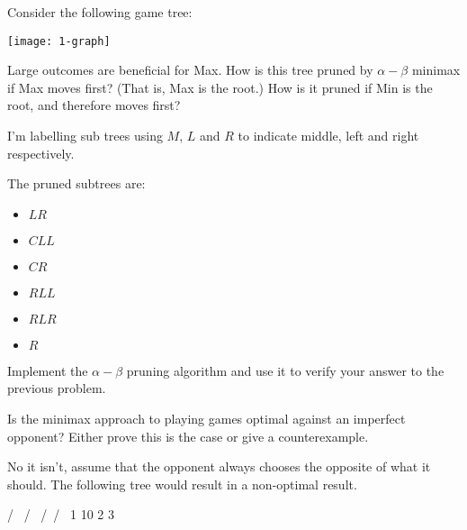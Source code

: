 \documentclass{supervision}
\begin{document}
\begin{questions}
    \question Consider the following game tree:
      \begin{center}
        \texttt{[image: 1-graph]}
      \end{center}

      Large outcomes are beneficial for Max. How is this tree pruned by $\alpha
      - \beta$ minimax if Max moves first? (That is, Max is the root.) How is it
      pruned if Min is the root, and therefore moves first?

      \begin{solution}
        I'm labelling sub trees using $M$, $L$ and $R$ to indicate middle, left
        and right respectively.

        The pruned subtrees are:

        \begin{itemize}
          \item $LR$
          \item $CLL$
          \item $CR$
          \item $RLL$
          \item $RLR$
          \item $R$
        \end{itemize}
      \end{solution}

    \question Implement the $\alpha - \beta$ pruning algorithm and use it to
      verify your answer to the previous problem.

    \question Is the minimax approach to playing games optimal against an
      imperfect opponent? Either prove this is the case or give a
      counterexample.

      \begin{solution}
        No it isn't, assume that the opponent always chooses the opposite of
        what it should. The following tree would result in a non-optimal result.

        \begin{code}{{}}

             / \
            /   \
           /\  / \
          1 10 2  3
        \end{code}
      \end{solution}

  \end{questions}
\end{document}
